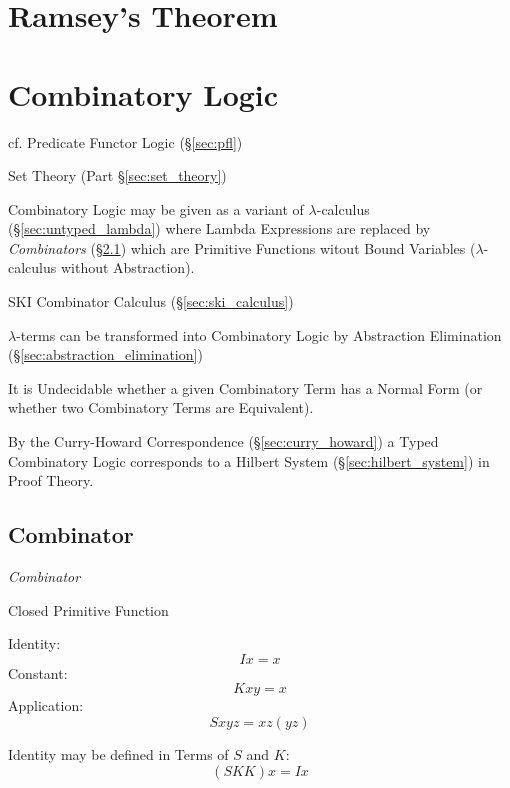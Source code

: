 \section{Ramsey's Theorem}\label{sec:ramseys_theorem}

\section{Combinatory Logic}\label{sec:combinatory_logic}

cf. Predicate Functor Logic (\S\ref{sec:pfl})

Set Theory (Part \S\ref{sec:set_theory})

Combinatory Logic may be given as a variant of $\lambda$-calculus
(\S\ref{sec:untyped_lambda}) where Lambda Expressions are replaced by
\emph{Combinators} (\S\ref{sec:combinator}) which are Primitive
Functions witout Bound Variables ($\lambda$-calculus without
Abstraction).

SKI Combinator Calculus (\S\ref{sec:ski_calculus})

$\lambda$-terms can be transformed into Combinatory Logic by
Abstraction Elimination (\S\ref{sec:abstraction_elimination})

It is Undecidable whether a given Combinatory Term has a Normal Form
(or whether two Combinatory Terms are Equivalent).

By the Curry-Howard Correspondence (\S\ref{sec:curry_howard}) a Typed
Combinatory Logic corresponds to a Hilbert System
(\S\ref{sec:hilbert_system}) in Proof Theory.



\subsection{Combinator}\label{sec:combinator}

\emph{Combinator}

Closed Primitive Function

Identity:
\[
  I x = x
\]
Constant:
\[
  K x y = x
\]
Application:
\[
  S x y z = x z (y z)
\]

Identity may be defined in Terms of $S$ and $K$:
\[
  (S K K) x = I x
\]




